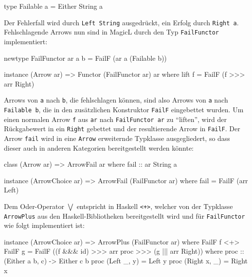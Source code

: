 \documentclass[12pt, a4paper, bibgerm]{scrbook}
\newenvironment{DIFnomarkup}{}{}
\newcommand\icode[1]{\lstinline?#1?}
\begin{document}
\begin{DIFnomarkup}\begin{code}
type Failable a = Either String a
\end{code}\end{DIFnomarkup}

Der Fehlerfall wird durch \icode{Left String} ausgedrückt, ein Erfolg
durch \icode{Right a}. Fehlschlagende Arrows nun sind in MagicL durch den
Typ \icode{FailFunctor} implementiert:

\begin{DIFnomarkup}\begin{code}
newtype FailFunctor ar a b = FailF (ar a (Failable b))

instance (Arrow ar) => Functor (FailFunctor ar) ar where
    lift f = FailF (f >>> arr Right)
\end{code}\end{DIFnomarkup} %

Arrows von \icode{a} nach \icode{b}, die fehlschlagen können, sind also
Arrows von \icode{a} nach \icode{Failable b}, die in den zusätzlichen
Konstruktor \icode{FailF} eingebettet wurden. Um einen normalen Arrow
\icode{f} aus \icode{ar} nach \icode{FailFunctor ar} zu "`liften"', wird
der Rückgabewert in ein \icode{Right} gebettet und der resultierende
Arrow in \icode{FailF}.
Der Arrow \icode{fail} wird in eine \icode{Arrow} erweiternde Typklasse
ausgegliedert, so dass dieser auch in anderen Kategorien bereitgestellt
werden könnte:

\begin{DIFnomarkup}\begin{code}
class (Arrow ar) => ArrowFail ar where
  fail :: ar String a

instance (ArrowChoice ar) => ArrowFail (FailFunctor ar) where
  fail = FailF (arr Left)
\end{code}\end{DIFnomarkup}

Dem Oder-Operator $\bigvee$ entspricht in Haskell \icode{<+>}, welcher
von der Typklasse \icode{ArrowPlus} aus den Haskell-Bibliotheken
bereitgestellt wird und für \icode{FailFunctor} wie folgt implementiert
ist:

\begin{DIFnomarkup}\begin{code}
instance (ArrowChoice ar) => ArrowPlus (FailFunctor ar) where
  FailF f <+> FailF g = FailF ((f &&& id) >>> arr proc >>> (g ||| arr Right))
   where proc :: (Either a b, c) -> Either c b
         proc (Left  _, y) = Left y
         proc (Right x, _) = Right x
\end{code}\end{DIFnomarkup} %
\end{document}
